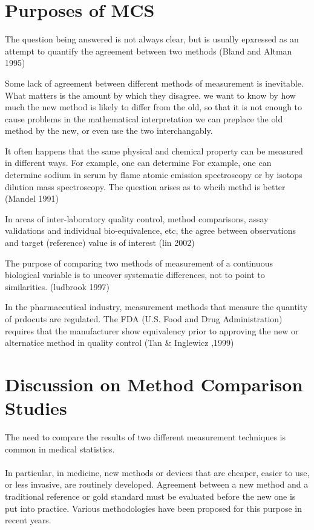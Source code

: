 \documentclass[12pt, a4paper]{report}
\theoremstyle{plain}
\theoremstyle{definition}
\theoremstyle{remark}
\begin{document}
	
	\section{Purposes of MCS}
	
	The  question being answered is not always clear, but is usually epxressed as an attempt to quantify the agreement
	between two methods (Bland and Altman 1995)
	
	Some lack of agreement between different methods of measurement is inevitable. What matters is the amount by which they
	disagree. we want to know by how much the new method is likely to differ from the old, so that it is not enough to cause
	problems in the mathematical interpretation we can preplace the old method by the new, or even use the two interchangably.
	
	
	It often happens that the same physical and chemical property can be measured in different ways. For example, one can determine
	For example, one can determine sodium in serum by flame atomic emission spectroscopy or by isotops dilution mass spectroscopy. The question arises as to whcih methd is better (Mandel 1991)
	
	In areas of inter-laboratory quality control, method comparisons, assay validations and individual bio-equivalence, etc, the agree between observations and target (reference) value is
	of interest (lin 2002)
	
	The purpose of comparing two methods of measurement of a continuous biological variable is to uncover systematic differences, not to point to
	similarities. (ludbrook 1997)
	
	In the pharmaceutical industry, measurement methods that measure the quantity of prdocuts are regulated. The FDA (U.S. Food and
	Drug Administration) requires that the manufacturer show equivalency prior to approving the new or alternatice method in quality control (Tan \& Inglewicz ,1999)
	
	\section{Discussion on Method Comparison Studies}
	
	The need to compare the results of two different measurement
	techniques is common in medical statistics.
	\\
	\\
	In particular, in medicine, new methods or devices that are
	cheaper, easier to use, or less invasive, are routinely developed.
	Agreement between a new method and a traditional reference or gold
	standard must be evaluated before the new one is put into
	practice. Various methodologies have been proposed for this
	purpose in recent years.
	
\end{document}

